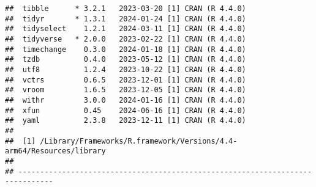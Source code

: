 \documentclass[
]{book}
\begin{document}
\begin{verbatim}
##  tibble      * 3.2.1   2023-03-20 [1] CRAN (R 4.4.0)
##  tidyr       * 1.3.1   2024-01-24 [1] CRAN (R 4.4.0)
##  tidyselect    1.2.1   2024-03-11 [1] CRAN (R 4.4.0)
##  tidyverse   * 2.0.0   2023-02-22 [1] CRAN (R 4.4.0)
##  timechange    0.3.0   2024-01-18 [1] CRAN (R 4.4.0)
##  tzdb          0.4.0   2023-05-12 [1] CRAN (R 4.4.0)
##  utf8          1.2.4   2023-10-22 [1] CRAN (R 4.4.0)
##  vctrs         0.6.5   2023-12-01 [1] CRAN (R 4.4.0)
##  vroom         1.6.5   2023-12-05 [1] CRAN (R 4.4.0)
##  withr         3.0.0   2024-01-16 [1] CRAN (R 4.4.0)
##  xfun          0.45    2024-06-16 [1] CRAN (R 4.4.0)
##  yaml          2.3.8   2023-12-11 [1] CRAN (R 4.4.0)
## 
##  [1] /Library/Frameworks/R.framework/Versions/4.4-arm64/Resources/library
## 
## ------------------------------------------------------------------------------
\end{verbatim}

  
\end{document}
